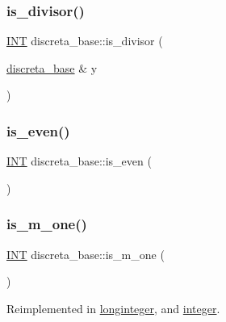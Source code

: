 \subsubsection{\texorpdfstring{is\+\_\+divisor()}{is\_divisor()}}
{\footnotesize\ttfamily \mbox{\hyperlink{galois_8h_a09fddde158a3a20bd2dcadb609de11dc}{I\+NT}} discreta\+\_\+base\+::is\+\_\+divisor (\begin{DoxyParamCaption}\item[{\mbox{\hyperlink{classdiscreta__base}{discreta\+\_\+base}} \&}]{y }\end{DoxyParamCaption})}

\mbox{\label{classdiscreta__base_a588ab4fb1bc60455db16ea7d1e6f74ca}} 
\subsubsection{\texorpdfstring{is\+\_\+even()}{is\_even()}}
{\footnotesize\ttfamily \mbox{\hyperlink{galois_8h_a09fddde158a3a20bd2dcadb609de11dc}{I\+NT}} discreta\+\_\+base\+::is\+\_\+even (\begin{DoxyParamCaption}{ }\end{DoxyParamCaption})}

\mbox{\label{classdiscreta__base_afc2e134e55759cf069f49fcf05af418b}} 
\subsubsection{\texorpdfstring{is\+\_\+m\+\_\+one()}{is\_m\_one()}}
{\footnotesize\ttfamily \mbox{\hyperlink{galois_8h_a09fddde158a3a20bd2dcadb609de11dc}{I\+NT}} discreta\+\_\+base\+::is\+\_\+m\+\_\+one (\begin{DoxyParamCaption}{ }\end{DoxyParamCaption})\hspace{0.3cm}{\ttfamily [virtual]}}



Reimplemented in \mbox{\hyperlink{classlonginteger_aa47d6521fc1dc8058d9eaa516caefabe}{longinteger}}, and \mbox{\hyperlink{classinteger_a7585957656c1152035411e066a4f0053}{integer}}.

